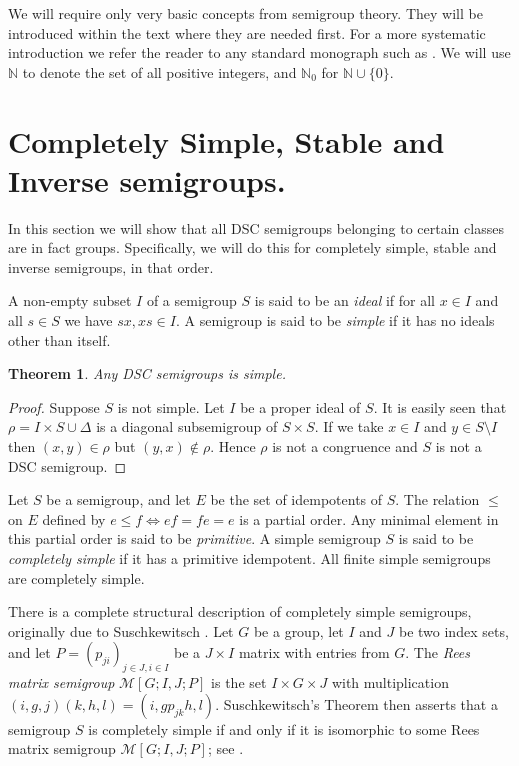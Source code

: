 \documentclass[a4paper, 12pt,reqno]{amsart}
\theoremstyle{plain}
\newtheorem{thm}{Theorem}[section]
\theoremstyle{definition}
\theoremstyle{remark}
\newcommand{\N}{\mathbb{N}}
\begin{document}
We will require only very basic concepts from semigroup theory. They will be introduced within the text where they are needed first. For a more systematic introduction we refer the reader to any standard monograph such as \cite{Ho95}.
We will use $\N$ to denote the set of all positive integers, and $\N_0$ for $\N\cup\{0\}$.





\section{Completely Simple, Stable and Inverse semigroups.}
\label{sec:SSI}

In this section we will show that all DSC semigroups belonging to certain classes  are in fact groups.
Specifically, we will do this for completely simple, stable and inverse semigroups, in that order.


A non-empty subset $I$ of a semigroup $S$ is said to be an \emph{ideal} if for all $x\in I$ and all $s\in S$ we have $sx,xs\in I$.
A semigroup is said to be \emph{simple} if it has no ideals other than itself.


\begin{thm}\label{simple semigroup}
    Any DSC semigroups is simple.
\end{thm}

\begin{proof}
    Suppose $S$ is not simple. Let $I$ be a proper ideal of $S$. It is easily seen that $\rho = I \times S \cup  \Delta$ is a diagonal subsemigroup of $S \times S$. If we take $x \in I$ and $y \in S \setminus I$ then $(x,y) \in \rho$ but $(y,x) \notin \rho$. Hence $\rho$ is not a congruence and $S$ is not a DSC semigroup.
\end{proof}

Let $S$ be a semigroup, and let $E$ be the set of idempotents of $S$.
The relation $\leq$ on $E$ defined by $e\leq f \iff ef=fe=e$ is a partial order.
Any minimal element in this partial order is said to be \emph{primitive}.
A simple semigroup $S$ is said to be \emph{completely simple} if it has a primitive idempotent. 
All finite simple semigroups are completely simple.

There is a complete structural description of completely simple semigroups, originally due to Suschkewitsch
\cite{Su28}.
Let $G$ be a group, let $I$ and $J$ be two index sets, and let $P=(p_{ji})_{j\in J,i\in I}$ be a $J\times I$ matrix with entries from $G$.
The \emph{Rees matrix semigroup} $\mathcal{M}[G;I,J;P]$ is the set $I\times G\times J$
with multiplication 
$(i , g , j)(k , h , l) = (i, g p_{jk} h , l)$.
Suschkewitsch's Theorem then asserts that a semigroup $S$ is completely simple if and only if it is isomorphic to some Rees matrix semigroup $\mathcal{M}[G;I,J;P]$; see \cite[Theorem~3.3.1]{Ho95}.
\end{document}
